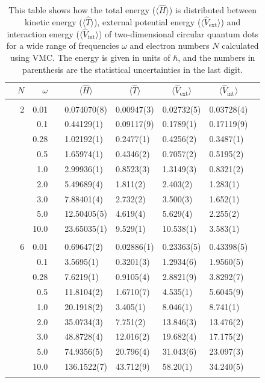 \begin{table}[H]
	\caption{This table shows how the total energy ($\langle\hat{H}\rangle$) is distributed between kinetic energy ($\langle\hat{T}\rangle$), external potential energy ($\langle\hat{V}_{\text{ext}}\rangle$) and interaction energy ($\langle\hat{V}_{\text{int}}\rangle$) of two-dimensional circular quantum dots for a wide range of frequencies $\omega$ and electron numbers $N$ calculated using VMC. The energy is given in units of $\hbar$, and the numbers in parenthesis are the statistical uncertainties in the last digit.}
	\label{tab:splitfrequencyQDVMC}
	\begin{tabularx}{\textwidth}{R{1cm}rrcR{2.3cm}R{2.3cm}R{2.3cm}R{2.3cm}R{1cm}} \hline\hline
		\makecell{\\ \phantom{$N$}} & $N$ & $\omega$ &&  &  &  &  & \\ \hline \\
		&2 & 0.01 && 0.074070(8) & 0.00947(3) & 0.02732(5) & 0.03728(4) \\
		&& 0.1 && 0.44129(1) & 0.09117(9) & 0.1789(1) & 0.17119(9) \\
		&& 0.28 && 1.02192(1) & 0.2477(1) & 0.4256(2) & 0.3487(1) \\
		&& 0.5 && 1.65974(1) & 0.4346(2) & 0.7057(2) & 0.5195(2)\\
		&& 1.0 && 2.99936(1) & 0.8523(3) & 1.3149(3) & 0.8321(2)\\
		&& 2.0 && 5.49689(4) & 1.811(2) & 2.403(2) & 1.283(1) \\
		&& 3.0 && 7.88401(4) & 2.732(2) & 3.500(3) & 1.652(1) \\ 
		&& 5.0 && 12.50405(5) & 4.619(4) & 5.629(4) & 2.255(2) \\
		&& 10.0 && 23.65035(1) & 9.529(1) & 10.538(1) & 3.583(1) \\
		\hdashline \\
		
		&6 & 0.01 && 0.69647(2) & 0.02886(1) & 0.23363(5) & 0.43398(5) \\
		&& 0.1 && 3.5695(1) & 0.3201(3) & 1.2934(6) & 1.9560(5) \\
		&& 0.28 && 7.6219(1) & 0.9105(4) & 2.8821(9) & 3.8292(7) \\
		&& 0.5 && 11.8104(2) & 1.6710(7) & 4.535(1) & 5.6045(9) \\
		&& 1.0 && 20.1918(2) & 3.405(1) & 8.046(1) & 8.741(1) \\
		&& 2.0 && 35.0734(3) & 7.751(2) & 13.846(3) & 13.476(2) \\
		&& 3.0 && 48.8728(4) & 12.016(2) & 19.682(4) & 17.175(2) \\ 
		&& 5.0 && 74.9356(5) & 20.796(4) & 31.043(6) & 23.097(3) \\
		&& 10.0 && 136.1522(7) & 43.712(9) & 58.20(1) & 34.240(5) \\
		\hdashline \\
		

\end{tabularx}
\end{table}
